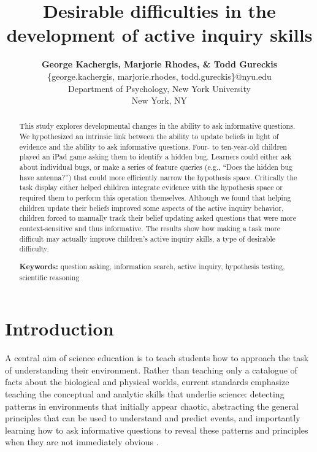 \documentclass[10pt,letterpaper]{article}
\title{Desirable difficulties in the development of active inquiry skills}
\author{
  {\large \bf George Kachergis, Marjorie Rhodes, \& Todd Gureckis} \\
  \{george.kachergis, marjorie.rhodes, todd.gureckis\}@nyu.edu \\
  Department of Psychology, New York University \\
  New York, NY
}
\begin{document}
\maketitle

\begin{abstract}
This study explores developmental changes in the ability to ask 
informative questions.  We hypothesized an intrinsic link between the ability to 
update beliefs in light of evidence and the ability to ask informative questions. 
Four- to ten-year-old children 
played an iPad game asking them to identify a hidden bug. Learners could either 
ask about individual bugs, or make a series of feature queries (e.g., ``Does the 
hidden bug have antenna?'') that could more efficiently narrow the hypothesis 
space. Critically the task display either helped children integrate evidence 
with the hypothesis space or required them to perform this operation themselves.  Although we 
found that helping children update their beliefs improved some aspects of the active 
inquiry behavior, children forced to manually track their belief updating asked questions that 
were more context-sensitive and thus informative.  The results show how making a 
task more difficult may actually improve children's active inquiry skills, a type of 
desirable difficulty.

\textbf{Keywords:} 
question asking, information search, active inquiry, hypothesis testing, scientific 
reasoning
\end{abstract}


\section{Introduction} 


A central aim of science education is to teach students how to approach the task of 
understanding their environment. Rather than teaching only a catalogue of facts 
about the biological and physical worlds, current standards emphasize teaching the 
conceptual and analytic skills that underlie science: detecting patterns in 
environments that initially appear chaotic, abstracting the general principles that can 
be used to understand and predict events, and importantly learning how to ask 
informative questions to reveal these patterns and principles when they are not 
immediately obvious \cite{Bransford:2000,Donovan:2005,Duschl:2007}. 
\end{document}
